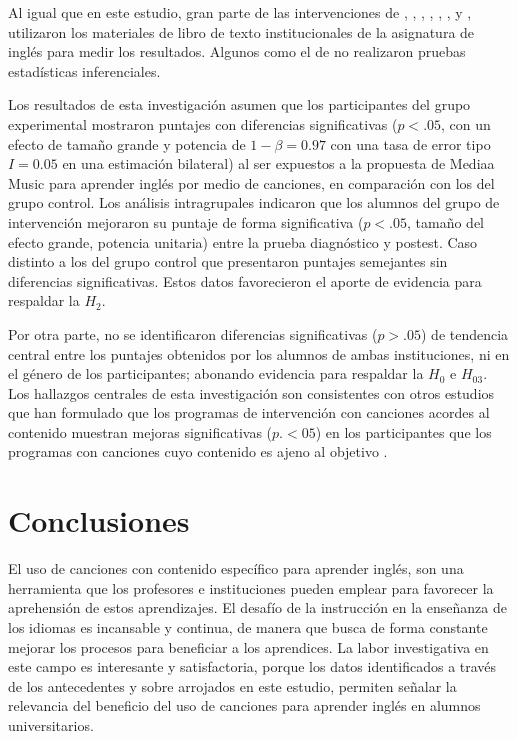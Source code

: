 \documentclass[spanish]{textolivre}
\begin{document}
Al igual que en este estudio, gran parte de las intervenciones de \textcite{farmand12013effect}, \textcite{ghanbari2014effects}, \cite{shehadejiman2016effectiveness}, \textcite{malekian2016relationship}, \textcite{andradesanchez2017use}, \textcite{javadisafa2018effects}, \textcite{suwartono2019songs} y \textcite{saldiraner2021using}, utilizaron los materiales de libro de texto institucionales de la asignatura de inglés para medir los resultados. Algunos como el de \textcite{ratnasari2007} no realizaron pruebas estadísticas inferenciales.

Los resultados de esta investigación asumen que los participantes del grupo experimental mostraron puntajes con diferencias significativas ($p<.05$, con un efecto de tamaño grande y potencia de $1-\beta=0.97$ con una tasa de error tipo $I = 0.05$ en una estimación bilateral) al ser expuestos a la propuesta de Mediaa Music para aprender inglés por medio de canciones, en comparación con los del grupo control. Los análisis intragrupales indicaron que los alumnos del grupo de intervención mejoraron su puntaje de forma significativa ($p<.05$, tamaño del efecto grande, potencia unitaria) entre la prueba diagnóstico y postest. Caso distinto a los del grupo control que presentaron puntajes semejantes sin diferencias significativas. Estos datos favorecieron el aporte de evidencia para respaldar la $H_2$.

Por otra parte, no se identificaron diferencias significativas ($p>.05$) de tendencia central entre los puntajes obtenidos por los alumnos de ambas instituciones, ni en el género de los participantes; abonando evidencia para respaldar la $H_0$ e $H_03$. Los hallazgos centrales de esta investigación son consistentes con otros estudios que han formulado que los programas de intervención con canciones acordes al contenido muestran mejoras significativas ($p.<05$) en los participantes que los programas con canciones cuyo contenido es ajeno al objetivo \cite{widerman2013study, harding2019cortical}.




\section{Conclusiones}

El uso de canciones con contenido específico para aprender inglés, son una herramienta que los profesores e instituciones pueden emplear para favorecer la aprehensión de estos aprendizajes. El desafío de la instrucción en la enseñanza de los idiomas es incansable y continua, de manera que busca de forma constante mejorar los procesos para beneficiar a los aprendices. La labor investigativa en este campo es interesante y satisfactoria, porque los datos identificados a través de los antecedentes y sobre arrojados en este estudio, permiten señalar la relevancia del beneficio del uso de canciones para aprender inglés en alumnos universitarios.
\end{document}
